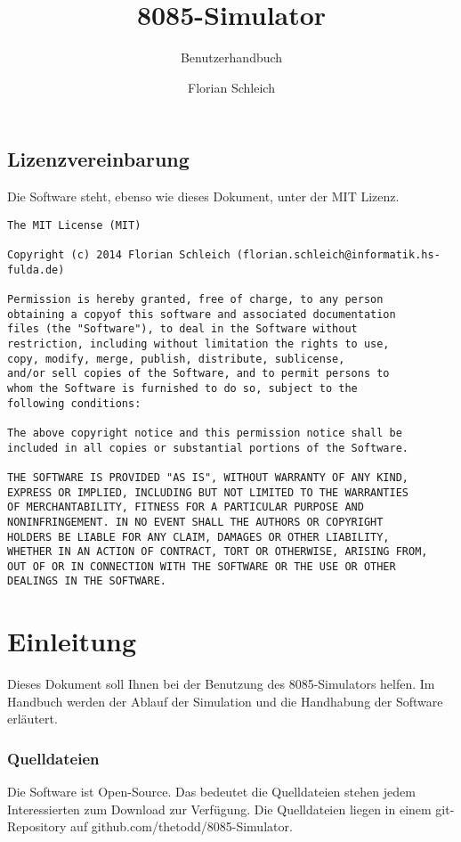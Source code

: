 \documentclass[11pt,a4paper]{hsfuldabook}
\begin{document}
\title{8085-Simulator}
\subtitle{Benutzerhandbuch}
\author{Florian Schleich}
\publishers{}
\uppertitleback{Entwickelt im Rahmen der Lehrveranstaltung "Mikrocontrollerprogrammierung"
an der Hochschule Fulda.}
\maketitle

\section*{Lizenzvereinbarung}
Die Software steht, ebenso wie dieses Dokument, unter der MIT Lizenz.

\begin{verbatim}
The MIT License (MIT)

Copyright (c) 2014 Florian Schleich (florian.schleich@informatik.hs-fulda.de)

Permission is hereby granted, free of charge, to any person
obtaining a copyof this software and associated documentation
files (the "Software"), to deal in the Software without
restriction, including without limitation the rights to use,
copy, modify, merge, publish, distribute, sublicense,
and/or sell copies of the Software, and to permit persons to
whom the Software is furnished to do so, subject to the
following conditions:

The above copyright notice and this permission notice shall be
included in all copies or substantial portions of the Software.

THE SOFTWARE IS PROVIDED "AS IS", WITHOUT WARRANTY OF ANY KIND,
EXPRESS OR IMPLIED, INCLUDING BUT NOT LIMITED TO THE WARRANTIES
OF MERCHANTABILITY, FITNESS FOR A PARTICULAR PURPOSE AND
NONINFRINGEMENT. IN NO EVENT SHALL THE AUTHORS OR COPYRIGHT
HOLDERS BE LIABLE FOR ANY CLAIM, DAMAGES OR OTHER LIABILITY,
WHETHER IN AN ACTION OF CONTRACT, TORT OR OTHERWISE, ARISING FROM,
OUT OF OR IN CONNECTION WITH THE SOFTWARE OR THE USE OR OTHER
DEALINGS IN THE SOFTWARE.
\end{verbatim}

\tableofcontents

\chapter{Einleitung}
Dieses Dokument soll Ihnen bei der Benutzung des 8085-Simulators helfen. Im Handbuch werden der
Ablauf der Simulation und die Handhabung der Software erläutert.

\subsection{Quelldateien}
Die Software ist Open-Source. Das bedeutet die Quelldateien stehen jedem Interessierten zum Download
zur Verfügung. Die Quelldateien liegen in einem git-Repository auf
github.com/thetodd/8085-Simulator.
\end{document}
